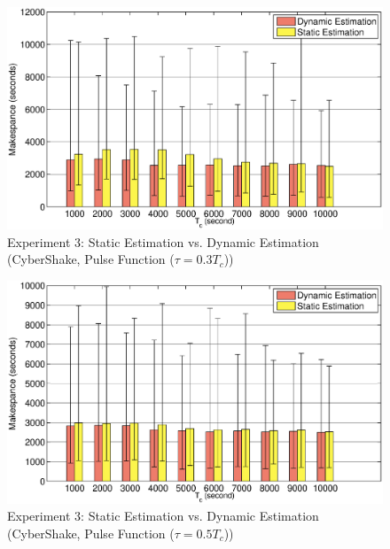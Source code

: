 \begin{figure}[!htb]
\centering
  \includegraphics[width=1\linewidth]{figures/tolerance/pulse_t30.eps}
  \caption{Experiment 3: Static Estimation vs. Dynamic Estimation (CyberShake, Pulse Function ($\tau=0.3T_c$))}
  \label{fig:expr_pulse_30}
\end{figure}

\begin{figure}[!htb]
\centering
  \includegraphics[width=1\linewidth]{figures/tolerance/pulse_t50.eps}
  \caption{Experiment 3: Static Estimation vs. Dynamic Estimation (CyberShake, Pulse Function ($\tau=0.5T_c$))}
  \label{fig:expr_pulse_50}
\end{figure}


